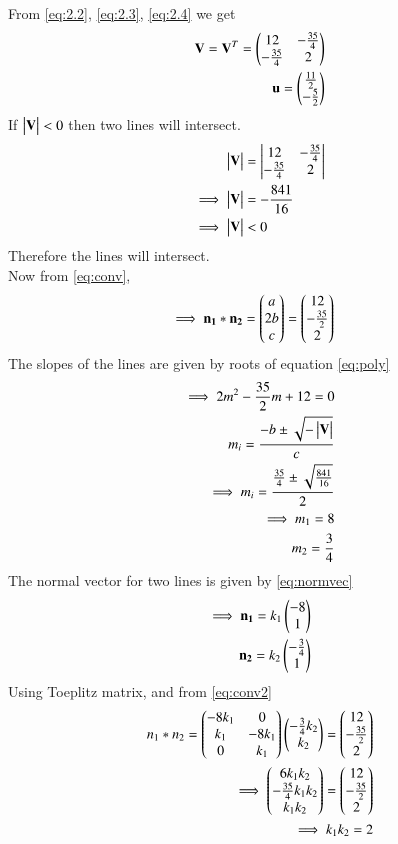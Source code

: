\documentclass[journal,12pt,twocolumn]{IEEEtran}
\begin{document}
From \eqref{eq:2.2}, \eqref{eq:2.3}, \eqref{eq:2.4} we get
\begin{align}
    \mathbf{V}=\mathbf{V}^T=\begin{pmatrix}12 & -\frac{35}{4} \\ -\frac{35}{4} & 2\end{pmatrix}\label{eq:2.48}\\
    \mathbf{u}=\begin{pmatrix}\frac{11}{2} \\ -\frac{5}{2}\end{pmatrix}\label{eq:2.49}
\end{align}
If $\begin{vmatrix}\mathbf{V}\end{vmatrix}<0$ then two lines will intersect.
\begin{align}
    \begin{vmatrix}\mathbf{V}\end{vmatrix}&=\begin{vmatrix}12 & -\frac{35}{4} \\ -\frac{35}{4} & 2\end{vmatrix}\\
    \implies\begin{vmatrix}\mathbf{V}\end{vmatrix}&=-\frac{841}{16}\\
    \implies\begin{vmatrix}\mathbf{V}\end{vmatrix}&<0
\end{align}
Therefore the lines will intersect.\\
Now from \eqref{eq:conv},
\begin{align}
    \implies\mathbf{n_1}*\mathbf{n_2}&=\begin{pmatrix}a \\ 2b \\c\end{pmatrix}=\begin{pmatrix}12\\-\frac{35}{2}\\2\end{pmatrix}\label{eq:conv2}
\end{align}
The slopes of the lines are given by roots of equation \eqref{eq:poly}
\begin{align}
    \implies 2m^2-\frac{35}{2}m+12=0\\
    m_i=\frac{-b\pm{\sqrt{-\ensuremath{\begin{vmatrix}\mathbf{V}\end{vmatrix}}}}}{c}\\
    \implies m_i=\frac{\frac{35}{4}\pm{\sqrt{\frac{841}{16}}}}{2}\\
    \implies m_1=8\\
     m_2=\frac{3}{4}
\end{align}
The normal vector for two lines is given by \eqref{eq:normvec}
\begin{align}
    \implies\mathbf{n_1}=k_1\begin{pmatrix}-8\\1\end{pmatrix}\label{eq:n3}\\
    \mathbf{n_2}=k_2\begin{pmatrix}-\frac{3}{4}\\1\end{pmatrix}\label{eq:n4}
\end{align}
Using Toeplitz matrix, and from \eqref{eq:conv2}
\begin{align}
    n_1*n_2=\begin{pmatrix}-8k_1 & 0\\k_1 & -8k_1\\0 & k_1\end{pmatrix}\begin{pmatrix}-\frac{3}{4}k_2 \\ k_2\end{pmatrix}=\begin{pmatrix}12\\-\frac{35}{2}\\2\end{pmatrix}\\
    \implies\begin{pmatrix}6k_1k_2\\-\frac{35}{4}k_1k_2\\k_1k_2\end{pmatrix}=\begin{pmatrix}12\\-\frac{35}{2}\\2\end{pmatrix}\\
    \implies k_1k_2=2
\end{align}
\end{document}
